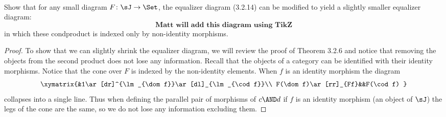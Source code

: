 \documentclass[../../main]{subfiles}
\begin{document}
\paragraph{}
\begin{exercise}
	 Show that for any small diagram $ F\colon \sJ \to \Set $, the equalizer 
	 diagram (3.2.14) can be modified to yield a slightly smaller equalizer 
	 diagram:
	$$ \textbf{Matt will add this diagram using TikZ}$$
	in which these condproduct is indexed only by non-identity morphisms. 
\end{exercise}

\begin{proof}
	To show that we can slightly shrink the equalizer diagram, we will review
	the proof of Theorem 3.2.6 and notice that removing the objects from the 
	second product does not lose any information. Recall that the objects of 
	a category can be identified with their identity morphisms. Notice that
	the cone over $ F $ is indexed by the non-identity elements. When $ f $
	is an identity morphism the diagram
	$$
	\xymatrix{&1\ar[dr]^{\lm_{\dom f}}\ar[dl]_{\lm_{\cod f}}\\
		F(\dom f)\ar[rr]_{Ff}&&F(\cod f)
	}
	$$
	collapses into a single line. Thus when defining the parallel pair of 
	morphisms of $ c\AND d $ if $ f $ is an identity morphism (an object of $ 
	\sJ $) the legs of the cone are the same, so we do not lose any information excluding them.   
\end{proof}
\end{document}
